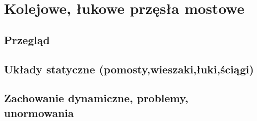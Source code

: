 \chapter{Kolejowe, łukowe przęsła mostowe}
\section{Przegląd}
\section{Układy statyczne (pomosty,wieszaki,łuki,ściągi)}
\section{Zachowanie dynamiczne, problemy, unormowania}

